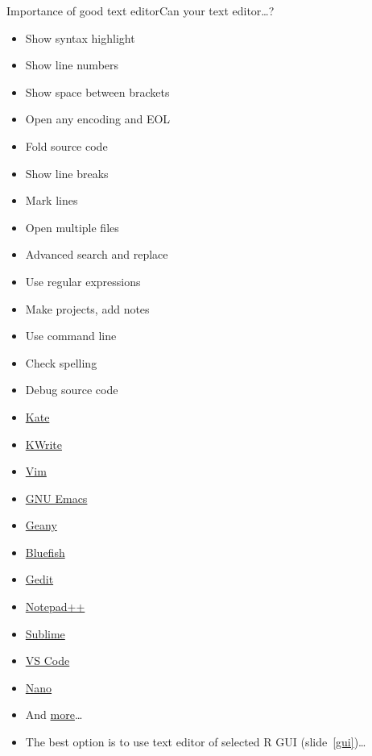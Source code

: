 \documentclass[compress, ucs, xelatex, 11pt, xcolor=svgnames, aspectratio=169,
	hyperref={
		bookmarks=true,
		unicode=true,
		colorlinks=true,
		pdftitle={Molecular data in R},
		plainpages=false,
		pdfauthor={Vojtech Zeisek},
		pdfsubject={Course about phylogeny and evolution in R},
		pdfcreator={XeLaTeX},
		pdfkeywords={R, evolution, phylogeny, molecular data},
		linkcolor=Crimson, %
		anchorcolor=Magenta, %
		citecolor=Magenta, %
		filecolor=Magenta, %
		menucolor=Magenta, %
		urlcolor=DodgerBlue, %
		pdftex},
	url={hyphens, lowtilde} %
	]{beamer}
\begin{document}
\begin{frame}{Importance of good text editor}{Can your text editor\ldots ?}
	\label{editors}
	\begin{multicols}{2}
		\begin{itemize}
			\item Show syntax highlight
			\item Show line numbers
			\item Show space between brackets
			\item Open any encoding and EOL
			\item Fold source code
			\item Show line breaks
			\item Mark lines
			\item Open multiple files
			\item Advanced search and replace
			\item Use regular expressions
			\item Make projects, add notes
			\item Use command line
			\item Check spelling
			\item Debug source code
		\end{itemize}
	\end{multicols}
	\vfill
	\vfill
	\begin{multicols}{4}
		\begin{itemize}
			\item \href{https://kate-editor.org/}{Kate}
			\item \href{https://apps.kde.org/kwrite/}{KWrite}
			\item \href{https://www.vim.org/}{Vim}
			\item \href{https://en.wikipedia.org/wiki/Emacs}{GNU Emacs}
			\item \href{https://www.geany.org/}{Geany}
			\item \href{https://bluefish.openoffice.nl/}{Bluefish}
			\item \href{https://wiki.gnome.org/Apps/Gedit}{Gedit}
			\item \href{https://notepad-plus-plus.org/}{Notepad++}
			\item \href{https://www.sublimetext.com/}{Sublime}
			\item \href{https://code.visualstudio.com/}{VS Code}
			\item \href{https://www.nano-editor.org/}{Nano}
			\item And \href{https://en.wikipedia.org/wiki/List_of_text_editors}{more}\ldots
		\end{itemize}
	\end{multicols}
	\vfill
	\begin{itemize}
		\item The best option is to use text editor of selected R GUI (slide~\ref{gui})\ldots
	\end{itemize}
\end{frame}
\end{document}
